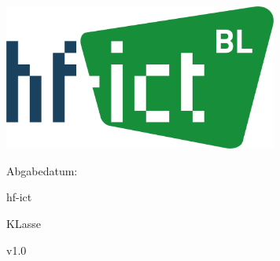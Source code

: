 \begin{titlepage}
	\begin{center}
		\normalsize
		\vspace{2cm} %
		\Huge
        \runtitle\\
		\vspace{1.5cm} %
		\includegraphics[width=9cm]{img/logo.png} \\ %
		\vspace{2cm} %
	\end{center}
	\normalsize
	\vfill %
    \begin{labeling}{Abgabedatum: }
        \item[Dokument:] \name
        \item[Thema:] \runtitle
        \item[Autor:] \runauthor
        \item[Schule:] hf-ict
        \item[Klasse:] KLasse
        \item[Dozent:] \dozent
		\item[Abgabedatum:] \abgabedatum
		\item[Version:] v1.0
	\end{labeling}
\end{titlepage}

